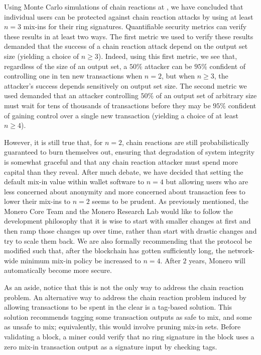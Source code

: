 \documentclass[12pt,english]{mrl}
\theoremstyle{definition}
\renewcommand{\geq}{\geqslant}
\numberwithin{equation}{section}
\numberwithin{figure}{section}
\numberwithin{equation}{section}
\numberwithin{equation}{section}
\numberwithin{figure}{section}
\begin{document}
Using Monte Carlo simulations of chain reactions at \cite{saturationUTXO}, we have concluded that individual users can be protected against chain reaction attacks by using at least $n=3$ mix-ins for their ring signatures. Quantifiable security metrics can verify these results in at least two ways. The first metric we used to verify these results demanded that the success of a chain reaction attack depend on the output set size (yielding a choice of $n \geq 3$). Indeed, using this first metric, we see that, regardless of the size of an output set, a $50\%$ attacker can be $95\%$ confident of controlling one in ten new transactions when $n=2$, but when $n\geq 3$, the attacker's success depends sensitively on output set size. The second metric we used demanded that an attacker controlling $50\%$ of an output set of arbitrary size must wait for tens of thousands of transactions before they may be $95\%$ confident of gaining control over a single new transaction (yielding a choice of at least $n \geq 4$).

However, it is still true that, for $n=2$, chain reactions are still probabilistically guaranteed to burn themselves out, ensuring that degradation of system integrity is somewhat graceful and that any chain reaction attacker must spend more capital than they reveal. After much debate, we have decided that setting the default mix-in value within wallet software to $n=4$ but allowing users who are less concerned about anonymity and more concerned about transaction fees to lower their mix-ins to $n=2$ seems to be prudent. As previously mentioned, the Monero Core Team and the Monero Research Lab would like to follow the development philosophy that it is wise to start with smaller changes at first and then ramp those changes up over time, rather than start with drastic changes and try to scale them back. We are also formally recommending that the protocol be modified such that, after the blockchain has gotten sufficiently long, the network-wide minimum mix-in policy be increased to $n=4$. After $2$ years, Monero will automatically become more secure.

As an aside, notice that this is not the only way to address the chain reaction problem. An alternative way to address the chain reaction problem induced by allowing transactions to be spent in the clear is a tag-based solution. This solution recommends tagging some transaction outputs as safe to mix, and some as unsafe to mix; equivalently, this would involve pruning mix-in sets. Before validating a block, a miner could verify that no ring signature in the block uses a zero mix-in transaction output as a signature input by checking tags.
\end{document}
